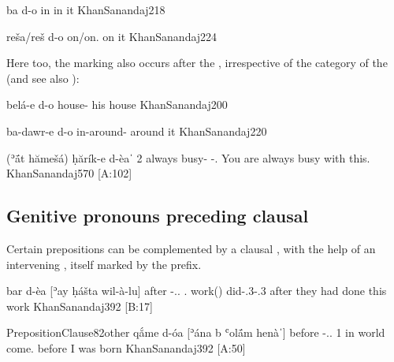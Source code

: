 {ba\cb{} d-o}
{in\cb{} \sg}
{in it}
{KhanSanandaj}{218}

{reša/reš d-o}
{on/on.\cst{} \sg}
{on it}
{KhanSanandaj}{224}





Here too, the \gen* marking also occurs after the \ez*, irrespective of the category of the \prim (and see also ):


{belá-e d-o}
{house-\ez{} \sg}
{his house}
{KhanSanandaj}{200}



{ba-dawr-e d-o}
{in-around-\ez{} \sg}
{around it}
{KhanSanandaj}{220}

{(ʾā́t hămešá) ḥărík-e d-èaˈ}
{2\sg{} always busy-\ez{} \gen-\dem.\sg}
{You are always busy with this.}
{KhanSanandaj}{570 {[A:102]}}


\subsection {Genitive pronouns preceding clausal \secns} \label{ss:gen_pron_clause}

Certain prepositions can be complemented by a clausal \secn, with the help of an intervening , itself marked by the \gen* prefix. 

{bar\cb{} d-èa [ʾay ḥášta wil-à-lu]}
{after\cb{} \gen-\dem.\near.\sg{} \dem.\near{} work(\fem) did-\patient.3\fem-\agent.3\pl}
{after they had done this work}
{KhanSanandaj}{392 {[B:17]}}

\acex
{Preposition}{Clause}{82other}
{qắme d-óa [ʾána b\cb{} ʿolā́m henàˈ]}
{before \gen-\dem.\far.\sg{} 1\sg{} in\cb{} world come.\masc}
{before I was born}
{KhanSanandaj}{392 {[A:50]}}

